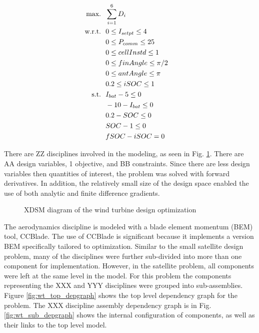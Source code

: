 \documentclass[]{aiaa-tc} %
\newcommand{\txt}{\textrm}
\begin{document}
    \begin{align}
        \\\txt{max.} &\ \ \sum_{i=1}^6 D_i \notag
        \\\txt{w.r.t.} & \ \ 0 \le I_{setpt} \le 4 \notag
        \\     & \ \ 0 \le P_{comm} \le 25 \notag
        \\     & \ \ 0 \le cellInstd \le 1 \notag
        \\     & \ \ 0 \le finAngle \le \pi/2 \notag
        \\     & \ \ 0 \le antAngle \le \pi \notag
        \\     & \ \ 0.2 \le iSOC \le 1 \notag
        \\\txt{s.t.} & \ \ I_{bat} - 5 \le 0 \notag
        \\     & \ \ -10 - I_{bat} \le 0 \notag
        \\     & \ \ 0.2 - SOC \le 0 \notag
        \\     & \ \ SOC - 1 \le 0 \notag
        \\     & \ \ fSOC - iSOC = 0 \notag
        \label{eqn:wt_formulation}
    \end{align}

    There are ZZ disciplines involved in the modeling, as seen in Fig. \ref{fig:xdsm_wt}. 
    There are AA design variables, 1 objective, and BB constraints. Since there are 
    less design variables then quantities of interest, the problem was solved with 
    forward derivatives. In addition, the relatively small size of the design space 
    enabled the use of both analytic and finite difference gradients. 
    

    \begin{figure}[!htbp]
        \caption{XDSM diagram of the wind turbine design optimization}
        \label{fig:xdsm_wt}
    \end{figure}

    The aerodynamics discipline is modeled with a blade element
    momentum (BEM) tool, CCBlade\cite{NING:BEM}. The use of CCBlade is significant because
    it implements a version BEM specifically tailored to optimization. 
    Similar to the small satellite design problem, many of the disciplines were further 
    sub-divided into more than one component for implementation. However, in the 
    satellite problem, all components were left at the same level in the model. For this 
    problem the components representing the XXX and YYY disciplines were 
    grouped into sub-assemblies. Figure \ref{fig:wt_top_depgraph} shows the 
    top level dependency graph for the problem. The XXX discipline assembly dependency 
    graph is in Fig. \ref{fig:wt_sub_depgraph} shows the internal configuration 
    of components, as well as their links to the top level model.  
\end{document}
